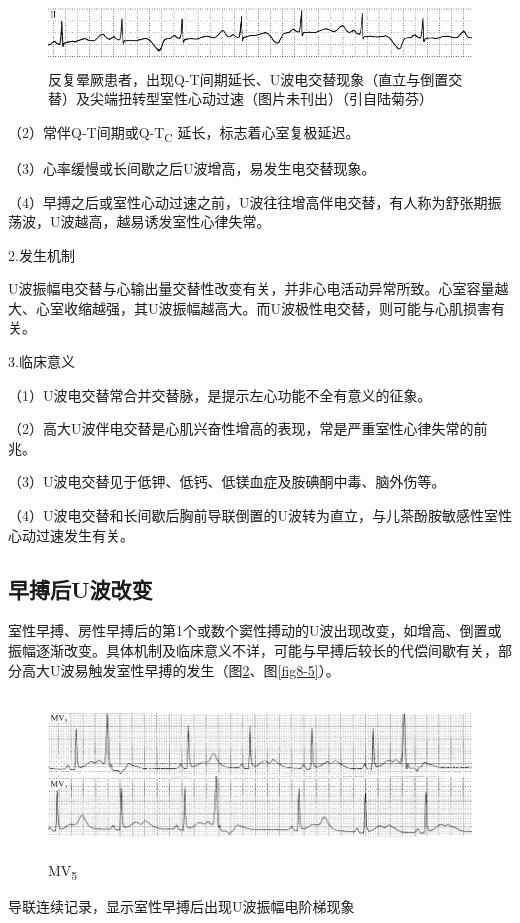 \begin{figure}[!htbp]
 \centering
 \includegraphics[width=5.57292in,height=0.66667in]{./images/Image00122.jpg}
 \captionsetup{justification=centering}
 \caption{反复晕厥患者，出现Q-T间期延长、U波电交替现象（直立与倒置交替）及尖端扭转型室性心动过速（图片未刊出）（引自陆菊芬）}
 \label{fig8-3}
  \end{figure} 

（2）常伴Q-T间期或Q-T\textsubscript{C} 延长，标志着心室复极延迟。

（3）心率缓慢或长间歇之后U波增高，易发生电交替现象。

（4）早搏之后或室性心动过速之前，U波往往增高伴电交替，有人称为舒张期振荡波，U波越高，越易诱发室性心律失常。

2.发生机制

U波振幅电交替与心输出量交替性改变有关，并非心电活动异常所致。心室容量越大、心室收缩越强，其U波振幅越高大。而U波极性电交替，则可能与心肌损害有关。

3.临床意义

（1）U波电交替常合并交替脉，是提示左心功能不全有意义的征象。

（2）高大U波伴电交替是心肌兴奋性增高的表现，常是严重室性心律失常的前兆。

（3）U波电交替见于低钾、低钙、低镁血症及胺碘酮中毒、脑外伤等。

（4）U波电交替和长间歇后胸前导联倒置的U波转为直立，与儿茶酚胺敏感性室性心动过速发生有关。

\protect\hypertarget{text00014.htmlux5cux23subid114}{}{}

\subsection{早搏后U波改变}

室性早搏、房性早搏后的第1个或数个窦性搏动的U波出现改变，如增高、倒置或振幅逐渐改变。具体机制及临床意义不详，可能与早搏后较长的代偿间歇有关，部分高大U波易触发室性早搏的发生（图\ref{fig8-4}、图\ref{fig8-5}）。

\begin{figure}[!htbp]
 \centering
 \includegraphics[width=5.78125in,height=1.6875in]{./images/Image00123.jpg}
 \captionsetup{justification=centering}
 \caption{MV\textsubscript{5}}
 \label{fig8-4}
  \end{figure} 
导联连续记录，显示室性早搏后出现U波振幅电阶梯现象

